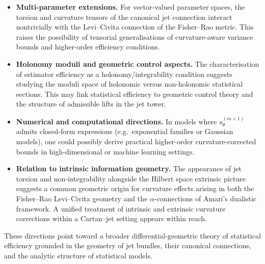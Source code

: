 \documentclass[3p,times]{elsarticle}
\begin{document}
\begin{itemize}
\item \textbf{Multi-parameter extensions.}  
  For vector-valued parameter spaces, the torsion and curvature tensors of the
  canonical jet connection interact nontrivially with the Levi–Civita
  connection of the Fisher–Rao metric.  
  This raises the possibility of tensorial generalisations of curvature-aware
  variance bounds and higher-order efficiency conditions.

\item \textbf{Holonomy moduli and geometric control aspects.}  
  The characterisation of estimator efficiency as a holonomy/integrability
  condition suggests studying the moduli space of holonomic versus
  non-holonomic statistical sections.  
  This may link statistical efficiency to geometric control theory and the
  structure of admissible lifts in the jet tower.

\item \textbf{Numerical and computational directions.}  
  In models where $s_\theta^{(m+1)}$ admits closed-form
  expressions (e.g.\ exponential families or Gaussian models),  
  one could possibly derive practical higher-order curvature-corrected bounds in
  high-dimensional or machine learning settings.

\item \textbf{Relation to intrinsic information geometry.}  
  The appearance of jet torsion and non-integrability alongside the Hilbert
  space extrinsic picture suggests a common geometric origin for curvature
  effects arising in both the Fisher–Rao Levi–Civita geometry and the
  $\alpha$-connections of Amari’s dualistic framework.  
  A unified treatment of intrinsic and extrinsic curvature corrections within a
  Cartan–jet setting appears within reach.

\end{itemize}

These directions point toward a broader differential-geometric theory of
statistical efficiency grounded in the geometry of jet bundles, their canonical
connections, and the analytic structure of statistical models.










\end{document}
